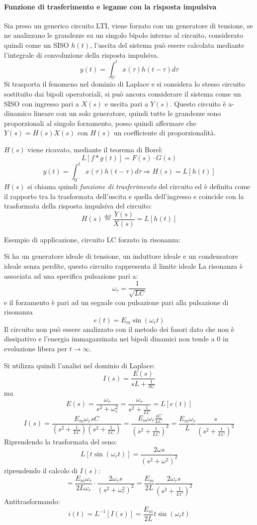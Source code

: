 \paragraph{Funzione di trasferimento e legame con la risposta impulsiva}
Sia preso un generico circuito LTI, viene forzato con un generatore di tensione, se ne analizzano
le grandezze su un singolo bipolo interno al circuito, considerato quindi come un SISO $h(t)$,
l'uscita del sistema può essere calcolata mediante l'integrale di convoluzione della risposta impulsiva.
$$
y(t) = \int_{0^-}^{t} x(\tau)h(t-\tau)d\tau
$$
Si trasporta il fenomeno nel dominio di Laplace e si considera lo stesso circuito sostituito dai bipoli
operatoriali, si può ancora considerare il sistema come un SISO con ingresso pari a $X(s)$ e uscita
pari a $Y(s)$.
Questo circuito è a-dinamico lineare con un solo generatore, quindi tutte le grandezze sono proporzionali
al singolo forzamento, posso quindi affermare che $Y(s) = H(s)X(s)$ con $H(s)$ un coefficiente di 
proporzionalità.

$H(s)$ viene ricavato, mediante il teorema di Borel:
$$
L[f*g(t)] = F(s)\cdot G(s)
$$
$$
y(t) = \int_{0^-}^{t} x(\tau)h(t-\tau) d\tau \Rightarrow H(s) = L[h(t)]
$$
$H(s)$ si chiama quindi \textit{funzione di trasferimento} del circuito ed è definita come il rapporto
tra la trasformata dell'uscita e quella dell'ingresso e coincide con la trasformata della risposta
impulsiva del circuito:
$$
H(s) \stackrel{\text{def}}{=} \frac{Y(s)}{X(s)} = L[h(t)]
$$

Esempio di applicazione, circuito LC forzato in risonanza:

Si ha un generatore ideale di tensione, un induttore ideale e un condensatore ideale senza perdite,
questo circuito rappresenta il limite ideale 
La risonanza è associata ad una specifica pulsazione pari a:
$$
\omega_r = \frac{1}{\sqrt{LC}}
$$
e il forzamento è pari ad un segnale con pulsazione pari alla pulsazione di risonanza
$$
e(t) = E_m \sin(\omega_r t)
$$
Il circuito non può essere analizzato con il metodo dei fasori dato che non è dissipativo e l'energia 
immagazzinata nei bipoli dinamici non tende a 0 in evoluzione libera per $t\to \infty$.

Si utilizza quindi l'analisi nel dominio di Laplace:
$$
I(s) = \frac{E(s)}{sL+ \frac{1}{SC}}
$$
ma
$$
E(s) = \frac{\omega_r}{s^2+\omega_r^2} = \frac{\omega_r}{s^2+\frac{1}{LC}} = L[e(t)]
$$
$$
I(s) = \frac{E_m\omega_r s C}{(s^2+\frac{1}{LC})(s^2+\frac{1}{LC})} = \frac{E_m\omega_r\frac{sC}{LC}}{(s^2+\frac{1}{LC})^2} = \frac{E_m\omega_r}{L} \frac{s}{(s^2+\frac{1}{LC})^2}
$$
Riprendendo la trasformata del seno:
$$
L[t\sin(\omega_r t)] = \frac{2\omega s}{(s^2+\omega^2)^2}
$$
riprendendo il calcolo di $I(s)$:
$$
= \frac{E_m\omega_r}{2L\omega_r}\cdot \frac{2\omega_r s}{(s^2+\omega_r^2)^2} = \frac{E_m}{2L}\frac{2\omega_r s}{(s^2+\frac{1}{LC})^2}
$$
Antitrasformando:
$$
i(t) = L^{-1}[I(s)] = \frac{E_m}{2L} t \sin(\omega_r t)
$$

